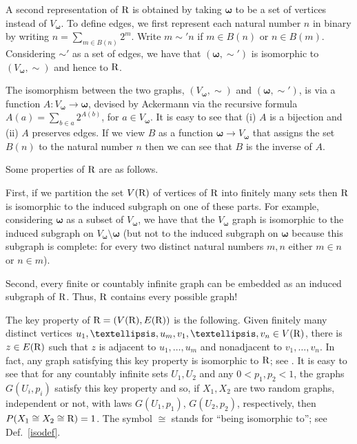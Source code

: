 \documentclass[reqno]{amsart}
\theoremstyle{theorem}
\theoremstyle{definition}
\theoremstyle{remark}
\newcommand{\1}{{\text{\Large $\mathfrak 1$}}}	%
\numberwithin{equation}{section}
\def\bomega{{\boldsymbol\omega}}
\def\Rado{\text{\textsf{\textbf{R}}}}
\begin{document}
A second representation of $\Rado$ is obtained by taking $\bomega$ to be a set
of vertices instead of $V_\bomega$.
To define edges, we first represent each natural number
$n$ in binary 
by writing $n=\sum_{m \in B(n)} 2^m$.
Write $m \sim' n$ 
if $m \in B(n)$ or $n \in B(m)$.
Considering $\sim'$ as a set of edges, we have that $(\bomega, \sim')$ is
isomorphic to $(V_\bomega, \sim)$ and hence to $\Rado$.

The isomorphism between the two graphs, 
$(V_\bomega, \sim)$ and $(\bomega, \sim')$,
is via a function 
$A : V_\bomega \to \bomega$, devised by Ackermann \cite{ACK37}
via the recursive formula
$A(a) = \sum_{b \in a} 2^{A(b)}$, for $a \in V_\bomega$.
It is easy to see that (i) $A$ is a bijection and (ii) $A$ preserves edges.
If we view $B$ as a function $\bomega \to V_\bomega$ that assigns the
set $B(n)$ to the natural number $n$ then we can see that $B$ is the inverse
of $A$.

Some properties of $\Rado$ are as follows.

First, if we partition the set $V(\Rado)$ of vertices of $\Rado$ 
into finitely many sets then 
$\Rado$ is isomorphic to the induced subgraph on one of these parts.
For example, considering $\bomega$ as a subset of $V_\bomega$,
we have that the $V_\bomega$ graph is isomorphic to the induced subgraph
on $V_\bomega \setminus \bomega$ (but not to the induced subgraph
on $\bomega$ because this subgraph is complete: for every two distinct natural
numbers $m, n$ either $m \in n$ or $n \in m$).

Second, every finite or countably infinite graph can be embedded
as an induced subgraph of $\Rado$.
Thus, $\Rado$ contains every possible graph!

The key property of $\Rado=(V(\Rado), E(\Rado))$ is the following. Given finitely
many distinct vertices $u_1, \ldots, u_m, v_1,\ldots, v_n \in V(\Rado)$,
there is $z \in E(\Rado)$ such that $z$ is adjacent to $u_1, \ldots, u_m$
and nonadjacent to $v_1, \ldots, v_n$.
In fact, any graph satisfying this key property is isomorphic to $\Rado$;
see \cite{CAM97}.
It is easy to see that for any countably infinite sets $U_1, U_2$
and any $0<p_1, p_2<1$, the graphs $G(U_i, p_i)$ satisfy this key property and  
so, if $X_1, X_2$ are two random graphs, independent or not,
with laws $G(U_1, p_1)$, $G(U_2, p_2)$, respectively,
then $P(X_1 \cong X_2 \cong \Rado)=1$. The symbol $\cong$ stands for
``being isomorphic to''; see Def.\ \ref{isodef}.
\end{document}
